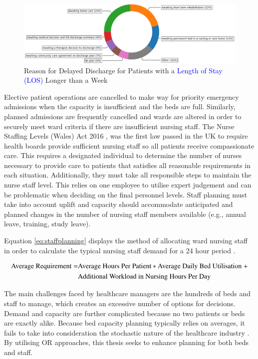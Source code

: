 \documentclass[../thesis.tex]{subfiles}
\begin{document}
\begin{figure}[h!]
    \centering
    \includegraphics[scale=0.7]{Chapters/Chapter1/Figures/piechart.png}
    \caption{Reason for Delayed Discharge for Patients with a \textcolor{blue}{Length of Stay (LOS)} Longer than a Week \cite{NuffieldTrust2022}}
    \label{fig:Piechartdelays}
\end{figure}

Elective patient operations are cancelled to make way for priority emergency admissions when the capacity is insufficient and the beds are full. Similarly, planned admissions are frequently cancelled and wards are altered in order to securely meet ward criteria if there are insufficient nursing staff. The Nurse Staffing Levels (Wales) Act 2016 \cite{NHSAct2006}, was the first law passed in the UK to require health boards provide sufficient nursing staff so all patients receive compassionate care. This requires a designated individual to determine the number of nurses necessary to provide care to patients that satisfies all reasonable requirements in each situation. Additionally, they must take all responsible steps to maintain the nurse staff level. This relies on one employee to utilise expert judgement and can be problematic when deciding on the final personnel levels. Staff planning must take into account uplift and capacity should accommodate anticipated and planned changes in the number of nursing staff members available (e.g., annual leave, training, study leave).

Equation \ref{eq:staffplanning} displays the method of allocating ward nursing staff in order to calculate the typical nursing staff demand for a 24 hour period \cite{NIHCE2014}. 

\begin{align}\label{eq:staffplanning}
    \text{Average Requirement} =& \text{Average Hours Per Patient} * \text{Average Daily Bed Utilisation } + \notag \\ &\text{Additional Workload in Nursing Hours Per Day}
\end{align}


The main challenges faced by healthcare managers are the hundreds of beds and staff to manage, which creates an excessive number of options for decisions. Demand and capacity are further complicated because no two patients or beds are exactly alike. Because bed capacity planning typically relies on averages, it fails to take into consideration the stochastic nature of the healthcare industry \textcolor{blue}{\cite{Harper2002}}. By utilising OR approaches, this thesis seeks to enhance planning for both beds and staff.
\end{document}
